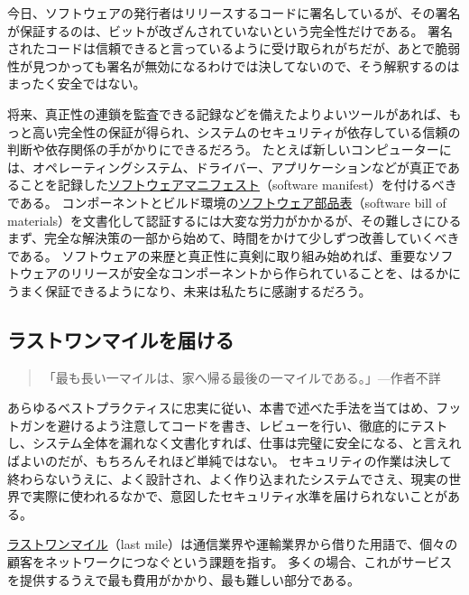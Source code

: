 \documentclass[uplatex]{jsarticle}
\def\label#1{}%
\begin{document}
今日、ソフトウェアの発行者はリリースするコードに署名しているが、その署名が保証するのは、ビットが改ざんされていないという完全性だけである。
署名されたコードは信頼できると言っているように受け取られがちだが、あとで脆弱性が見つかっても署名が無効になるわけでは決してないので、そう解釈するのはまったく安全ではない。

将来、真正性の連鎖を監査できる記録などを備えたよりよいツールがあれば、もっと高い完全性の保証が得られ、システムのセキュリティが依存している信頼の判断や依存関係の手がかりにできるだろう。
たとえば新しいコンピューターには、オペレーティングシステム、ドライバー、アプリケーションなどが真正であることを記録した\underline{ソフトウェアマニフェスト}（software manifest）を付けるべきである。
コンポーネントとビルド環境の\underline{ソフトウェア部品表}（software bill of materials）を文書化して認証するには大変な労力がかかるが、その難しさにひるまず、完全な解決策の一部から始めて、時間をかけて少しずつ改善していくべきである。
ソフトウェアの来歴と真正性に真剣に取り組み始めれば、重要なソフトウェアのリリースが安全なコンポーネントから作られていることを、はるかにうまく保証できるようになり、未来は私たちに感謝するだろう。

\subsection{ラストワンマイルを届ける}

\begin{quote}
「最も長い一マイルは、家へ帰る最後の一マイルである。」---作者不詳
\end{quote}

あらゆるベストプラクティスに忠実に従い、本書で述べた手法を当てはめ、フットガンを避けるよう注意してコードを書き、レビューを行い、徹底的にテストし、システム全体を漏れなく文書化すれば、仕事は完璧に安全になる、と言えればよいのだが、もちろんそれほど単純ではない。
セキュリティの作業は決して終わらないうえに、よく設計され、よく作り込まれたシステムでさえ、現実の世界で実際に使われるなかで、意図したセキュリティ水準を届けられないことがある。

\begin{dfn}[ラストワンマイル]\label{dfn:ch14-last-mile}
\underline{ラストワンマイル}（last mile）は通信業界や運輸業界から借りた用語で、個々の顧客をネットワークにつなぐという課題を指す。
多くの場合、これがサービスを提供するうえで最も費用がかかり、最も難しい部分である。
\end{dfn}
\end{document}
